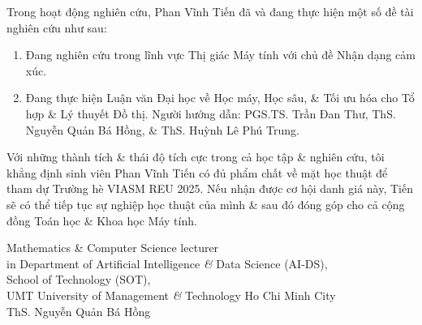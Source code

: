 \documentclass[11pt]{article}
\begin{document}
Trong hoạt động nghiên cứu, {\sc Phan Vĩnh Tiến} đã và đang thực hiện một số đề tài nghiên cứu như sau:
\begin{enumerate}
    \item Đang nghiên cứu trong lĩnh vực Thị giác Máy tính với chủ đề Nhận dạng cảm xúc.
    
    \item Đang thực hiện Luận văn Đại học về Học máy, Học sâu, \& Tối ưu hóa cho Tổ hợp \& Lý thuyết Đồ thị. Người hướng dẫn: PGS.TS. {\sc Trần Đan Thư}, ThS. {\sc Nguyễn Quản Bá Hồng}, \& ThS. {\sc Huỳnh Lê Phú Trung}.
\end{enumerate}
Với những thành tích \& thái độ tích cực trong cả học tập \& nghiên cứu, tôi khẳng định sinh viên {\sc Phan Vĩnh Tiến} có đủ phẩm chất về mặt học thuật để tham dự Trường hè VIASM REU 2025. Nếu nhận được cơ hội danh giá này, {\sc Tiến} sẽ có thể tiếp tục sự nghiệp học thuật của mình \& sau đó đóng góp cho cả cộng đồng Toán học \& Khoa học Máy tính.


\begin{flushright}    
    Mathematics \& Computer Science lecturer\\in Department of Artificial Intelligence {\it\&} Data Science (AI-DS),\\School of Technology (SOT),\\UMT University of Management {\it\&} Technology Ho Chi Minh City\\
    \vspace{2cm}
    ThS. {\sc Nguyễn Quản Bá Hồng}
\end{flushright}


\printbibliography[heading=bibintoc]
\end{document}
